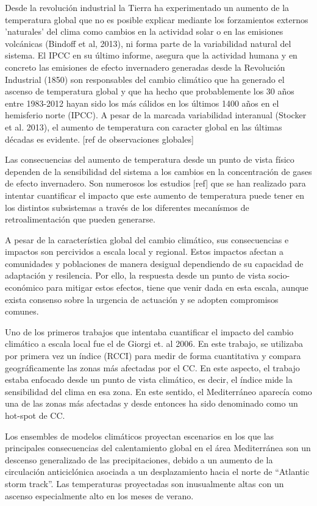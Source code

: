 Desde la revolución industrial la Tierra ha experimentado un aumento de la temperatura global que no es posible explicar mediante los forzamientos externos 'naturales'  del clima como cambios en la actividad solar o en las emisiones volcánicas (Bindoff et al, 2013), ni forma parte de la variabilidad natural del sistema. El IPCC en su último informe, asegura que la actividad humana y en concreto las emisiones de efecto invernadero generadas desde la Revolución Industrial (1850) son responsables del cambio climático que ha generado el ascenso de temperatura global y que ha hecho que probablemente los 30 años entre 1983-2012 hayan sido los más cálidos en los últimos 1400 años en el hemisferio norte (IPCC). A pesar de la marcada variabilidad interanual (Stocker et al. 2013), el aumento de temperatura con caracter global en las últimas décadas es evidente. [ref de observaciones globales]

Las consecuencias del aumento de temperatura desde un punto de vista físico dependen de la sensibilidad del sistema a los cambios en la concentración de gases de efecto invernadero. Son numerosos los estudios [ref] que se han realizado para intentar cuantificar el impacto que este aumento de temperatura puede tener en los distintos subsistemas a través de los diferentes mecanísmos de retroalimentación que pueden generarse.

A pesar de la característica global del cambio climático, sus consecuencias e impactos son percividos a escala local y regional. Estos impactos afectan a comunidades y poblaciones de manera desigual dependiendo de su capacidad de adaptación y resilencia. Por ello, la respuesta desde un punto de vista socio-económico para mitigar estos efectos, tiene que venir dada en esta escala, aunque exista consenso sobre la urgencia de actuación y se adopten compromisos comunes.

Uno de los primeros trabajos que intentaba cuantificar el impacto del cambio climático a escala local fue el de Giorgi et. al 2006. En este trabajo, se utilizaba por primera vez un índice (RCCI) para medir de forma cuantitativa y compara geográficamente las zonas más afectadas por el CC. En este aspecto, el trabajo estaba enfocado desde un punto de vista climático, es decir, el índice mide la sensibilidad del clima en esa zona. En este sentido, el Mediterráneo aparecía como una de las zonas más afectadas y desde entonces ha sido denominado como un hot-spot de CC.

Los ensembles de modelos climáticos proyectan escenarios en los que las principales consecuencias del calentamiento global en el área Mediterránea son un descenso generalizado de las precipitaciones, debido a un aumento de la circulación anticiclónica asociada a un desplazamiento hacia el norte de ``Atlantic storm track''. Las temperaturas proyectadas son inusualmente altas con un ascenso especialmente alto en los meses de verano.


